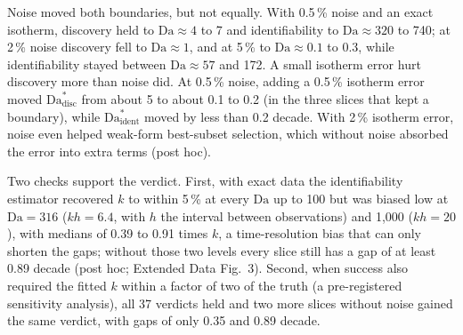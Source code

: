 \documentclass[11pt]{article}
\newcommand{\Da}{\mathrm{Da}}
\begin{document}
Noise moved both boundaries, but not equally. With 0.5\,\% noise and an exact isotherm, discovery
held to $\Da \approx 4$ to 7 and identifiability to $\Da \approx 320$ to 740; at 2\,\% noise
discovery fell to $\Da \approx 1$, and at 5\,\% to $\Da \approx 0.1$ to 0.3, while identifiability
stayed between $\Da \approx 57$ and 172. A small isotherm error hurt discovery more than noise
did. At 0.5\,\% noise, adding a 0.5\,\% isotherm error moved $\Da^{*}_{\mathrm{disc}}$ from about 5
to about 0.1 to 0.2 (in the three slices that kept a boundary), while $\Da^{*}_{\mathrm{ident}}$
moved by less than 0.2 decade. With 2\,\% isotherm error, noise even helped weak-form best-subset selection, which without noise
absorbed the error into extra terms (post hoc).



Two checks support the verdict. First, with exact data the identifiability estimator recovered $k$
to within 5\,\% at every $\Da$ up to 100 but was biased low at $\Da = 316$ ($kh = 6.4$, with $h$ the interval between observations) and 1,000
($kh = 20$), with medians of 0.39 to 0.91 times $k$, a time-resolution bias that can only shorten the gaps; without those two levels every slice
still has a gap of at least 0.89 decade (post hoc; Extended Data Fig.~3). Second, when success
also required the fitted $k$ within a factor of two of the truth (a pre-registered sensitivity
analysis), all 37 verdicts held and two more slices without noise gained the same verdict, with gaps of only 0.35
and 0.89 decade.
\end{document}

